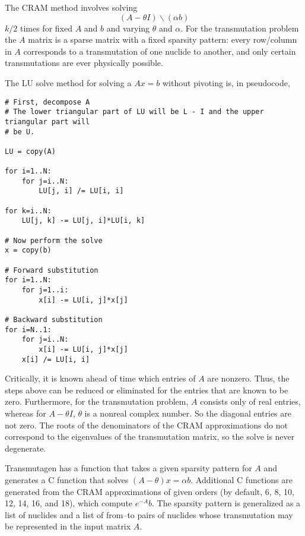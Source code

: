 The CRAM method involves solving
\begin{equation}
 (A - \theta I)\backslash(\alpha b)
\end{equation}
$k/2$ times for fixed $A$ and $b$ and varying $\theta$ and $\alpha$. For the
transmutation problem the $A$ matrix is a sparse matrix with a fixed sparsity
pattern: every row/column in $A$ corresponds to a transmutation of one nuclide
to another, and only certain transmutations are ever physically possible.

The LU solve method for solving a $Ax=b$ without pivoting is, in pseudocode,

\begin{verbatim}
# First, decompose A
# The lower triangular part of LU will be L - I and the upper triangular part will
# be U.

LU = copy(A)

for i=1..N:
    for j=i..N:
        LU[j, i] /= LU[i, i]

for k=i..N:
    LU[j, k] -= LU[j, i]*LU[i, k]

# Now perform the solve
x = copy(b)

# Forward substitution
for i=1..N:
    for j=1..i:
        x[i] -= LU[i, j]*x[j]

# Backward substitution
for i=N..1:
    for j=i..N:
        x[i] -= LU[i, j]*x[j]
    x[i] /= LU[i, i]
\end{verbatim}

Critically, it is known ahead of time which entries of $A$ are nonzero. Thus,
the steps above can be reduced or eliminated for the entries that are known to
be zero. Furthermore, for the transmutation problem, $A$ consists only of real
entries, whereas for $A - \theta I$, $\theta$ is a nonreal complex number. So
the diagonal entries are not zero. The roots of the denominators of the CRAM
approximations do not correspond to the eigenvalues of the transmutation
matrix, so the solve is never degenerate.

Transmutagen has a function that takes a given sparsity pattern for $A$ and
generates a C function that solves $(A - \theta)x =\alpha b$. Additional C
functions are generated from the CRAM approximations of given orders (by
default, 6, 8, 10, 12, 14, 16, and 18), which compute $e^{-A}b$. The sparsity
pattern is generalized as a list of nuclides and a list of from--to pairs
of nuclides whose transmutation may be represented in the input matrix $A$.
